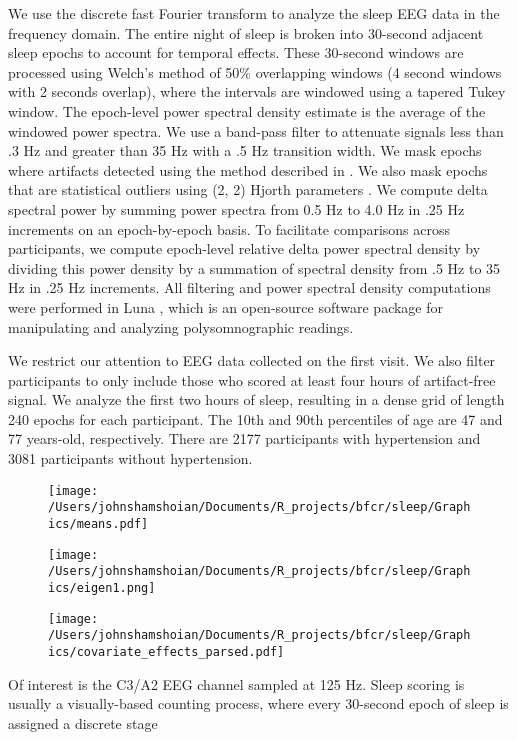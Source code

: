 \documentclass[useAMS,referee,usenatbib]{biom}
\begin{document}
We use the discrete fast Fourier transform to analyze the sleep EEG data in the frequency domain. The entire night of sleep is broken into 30-second adjacent sleep epochs to account for temporal effects. These 30-second windows are processed using Welch's method of 50\% overlapping windows (4 second windows with 2 seconds overlap), where the intervals are windowed using a tapered Tukey window. The epoch-level power spectral density estimate is the average of the windowed power spectra. We use a band-pass filter to attenuate signals less than .3 Hz and greater than 35 Hz with a .5 Hz transition width. We mask epochs where artifacts detected using the method described in \citet{Buckelmuller2006}. We also mask epochs that are statistical outliers using (2, 2) Hjorth parameters \citet{Hjorth1970}. We compute delta spectral power by summing power spectra from 0.5 Hz to 4.0 Hz in .25 Hz increments on an epoch-by-epoch basis. To facilitate comparisons across participants, we compute epoch-level relative delta power spectral density by dividing this power density by a summation of spectral density from .5 Hz to 35 Hz in .25 Hz increments. All filtering and power spectral density computations were performed in Luna \citep{Shaun2020}, which is an open-source software package for manipulating and analyzing polysomnographic readings.

We restrict our attention to EEG data collected on the first visit. We also filter participants to only include those who scored at least four hours of artifact-free signal. We analyze the first two hours of sleep, resulting in a dense grid of length 240 epochs for each participant. The 10th and 90th percentiles of age are 47 and 77 years-old, respectively. There are 2177 participants with hypertension and 3081 participants without hypertension.

\begin{figure}
	\centering
	\texttt{[image: /Users/johnshamshoian/Documents/R\_projects/bfcr/sleep/Graphics/means.pdf]}
\end{figure}
\begin{figure}
	\centering
	\texttt{[image: /Users/johnshamshoian/Documents/R\_projects/bfcr/sleep/Graphics/eigen1.png]}
\end{figure}
\begin{figure}
	\centering
	\texttt{[image: /Users/johnshamshoian/Documents/R\_projects/bfcr/sleep/Graphics/covariate\_effects\_parsed.pdf]}
\end{figure}
 Of interest is the C3/A2 EEG channel sampled at 125 Hz. Sleep scoring is usually a visually-based counting process, where every 30-second epoch of sleep is assigned a discrete stage
\label{s:data}
\end{document}
